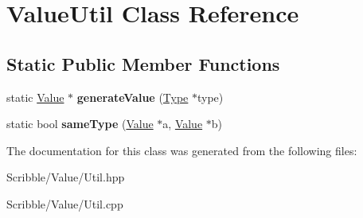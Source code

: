 \hypertarget{class_value_util}{\section{Value\-Util Class Reference}
\label{class_value_util}
}
\subsection*{Static Public Member Functions}
\begin{DoxyCompactItemize}
\item 
\hypertarget{class_value_util_a7ed8ce4940d42081e48ca293ad062963}{static \hyperlink{class_value}{Value} $\ast$ {\bfseries generate\-Value} (\hyperlink{class_type}{Type} $\ast$type)}\label{class_value_util_a7ed8ce4940d42081e48ca293ad062963}

\item 
\hypertarget{class_value_util_aa2c818921409aae26704dcd22a15dc80}{static bool {\bfseries same\-Type} (\hyperlink{class_value}{Value} $\ast$a, \hyperlink{class_value}{Value} $\ast$b)}\label{class_value_util_aa2c818921409aae26704dcd22a15dc80}

\end{DoxyCompactItemize}


The documentation for this class was generated from the following files\-:\begin{DoxyCompactItemize}
\item 
Scribble/\-Value/Util.\-hpp\item 
Scribble/\-Value/Util.\-cpp\end{DoxyCompactItemize}

